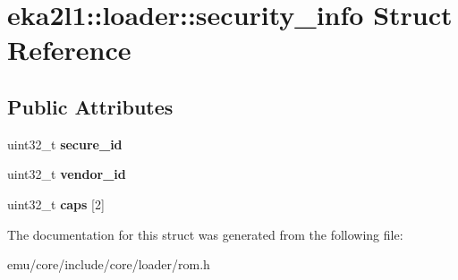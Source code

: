 \hypertarget{structeka2l1_1_1loader_1_1security__info}{}\section{eka2l1\+:\+:loader\+:\+:security\+\_\+info Struct Reference}
\label{structeka2l1_1_1loader_1_1security__info}
\subsection*{Public Attributes}
\begin{DoxyCompactItemize}
\item 
\mbox{\label{structeka2l1_1_1loader_1_1security__info_a8ae214f7dc1ac6785eb1ff37da38dfa9}} 
uint32\+\_\+t {\bfseries secure\+\_\+id}
\item 
\mbox{\label{structeka2l1_1_1loader_1_1security__info_aa7129004ed5571b8e42e0437bf2a04e6}} 
uint32\+\_\+t {\bfseries vendor\+\_\+id}
\item 
\mbox{\label{structeka2l1_1_1loader_1_1security__info_a32e65ebe2dfef35110b189168c740f23}} 
uint32\+\_\+t {\bfseries caps} \mbox{[}2\mbox{]}
\end{DoxyCompactItemize}


The documentation for this struct was generated from the following file\+:\begin{DoxyCompactItemize}
\item 
emu/core/include/core/loader/rom.\+h\end{DoxyCompactItemize}
